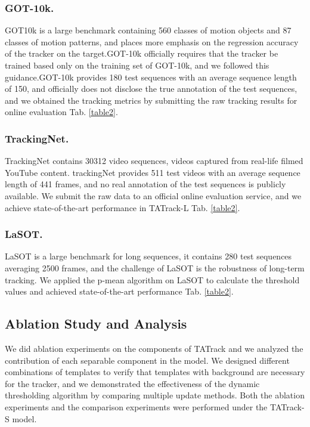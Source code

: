 \documentclass[letterpaper]{article} \usepackage{aaai23}  \usepackage{times}  \usepackage{helvet}  \usepackage{courier}  \usepackage[hyphens]{url}  \usepackage{graphicx} \urlstyle{rm} \def\UrlFont{\rm}  \usepackage{natbib}  \usepackage{caption} \frenchspacing  \setlength{\pdfpagewidth}{8.5in}  \setlength{\pdfpageheight}{11in}  \usepackage{algorithm}
\begin{document}
\subsubsection{GOT-10k.}
GOT10k \cite{got} is a large benchmark containing 560 classes of motion objects and 87 classes of motion patterns, and places more emphasis on the regression accuracy of the tracker on the target.GOT-10k officially requires that the tracker be trained based only on the training set of GOT-10k, and we followed this guidance.GOT-10k provides 180 test sequences with an average sequence length of 150, and officially does not disclose the true annotation of the test sequences, and we obtained the tracking metrics by submitting the raw tracking results for online evaluation Tab. \ref{table2}. 

\subsubsection{TrackingNet.}
TrackingNet \cite{trackingnet} contains 30312 video sequences, videos captured from real-life filmed YouTube content. trackingNet provides 511 test videos with an average sequence length of 441 frames, and no real annotation of the test sequences is publicly available. We submit the raw data to an official online evaluation service, and we achieve state-of-the-art performance in TATrack-L Tab. \ref{table2}.

\subsubsection{LaSOT.}
LaSOT \cite{lasot} is a large benchmark for long sequences, it contains 280 test sequences averaging 2500 frames, and the challenge of LaSOT is the robustness of long-term tracking. We applied the p-mean algorithm on LaSOT to calculate the threshold values and achieved state-of-the-art performance Tab. \ref{table2}.





\subsection{Ablation Study and Analysis}
We did ablation experiments on the components of TATrack and we analyzed the contribution of each separable component in the model. We designed different combinations of templates to verify that templates with background are necessary for the tracker, and we demonstrated the effectiveness of the dynamic thresholding algorithm by comparing multiple update methods. Both the ablation experiments and the comparison experiments were performed under the TATrack-S model.
\end{document}
